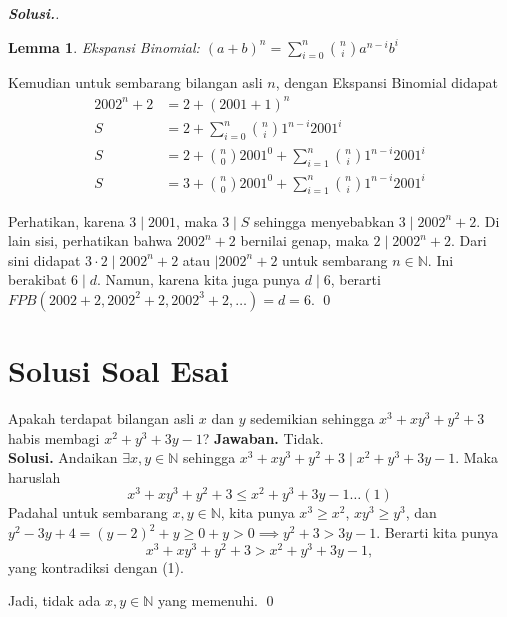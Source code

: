 \documentclass[12pt]{scrartcl}
\newtheorem{lemma}{Lemma} %
\begin{document}
\begin{enumerate}
\begin{proof}[\textbf{Solusi.}]
		\begin{lemma}
					Ekspansi Binomial: $(a+b)^n=\sum_{i=0}^{n} {n \choose i}a^{n-i}b^i$
		\end{lemma}
		
		Kemudian untuk sembarang bilangan asli $n$, dengan Ekspansi Binomial didapat
		\begin{align*}
		2002^n+2 &= 2+(2001+1)^n\\
			S	&= 2 + \sum_{i=0}^{n} {n \choose i}1^{n-i}2001^i\\
			S	&= 2 + {n \choose 0}2001^0 + \sum_{i=1}^{n} {n \choose i}1^{n-i}2001^i\\
			S	&= 3 + {n \choose 0}2001^0 + \sum_{i=1}^{n} {n \choose i}1^{n-i}2001^i
		\end{align*}
			
		Perhatikan, karena $3 \mid 2001$, maka $3 \mid S$ sehingga menyebabkan $3 \mid 2002^n+2$. Di lain sisi, perhatikan bahwa $2002^n+2$ bernilai genap, maka $2 \mid 2002^n +2$. Dari sini didapat $3\cdot2 \mid 2002^n+2$ atau $\mid 2002^n+2$ untuk sembarang $n \in \mathbb{N}$. Ini berakibat $6 \mid d$. Namun, karena kita juga punya $d \mid 6$, berarti $FPB(2002+2,2002^2+2,2002^3+2,\dots)=d=6$. \qed
  \end{proof}

\end{enumerate}

\section{Solusi Soal Esai}
Apakah terdapat bilangan asli $x$ dan $y$ sedemikian sehingga $x^3+xy^3+y^2+3$ habis membagi $x^2+y^3+3y-1$?
	\textbf{Jawaban. }
	Tidak.\\
 
	\textbf{Solusi. }
	Andaikan $\exists x,y \in \mathbb{N}$ sehingga $x^3+xy^3+y^2+3 \mid x^2+y^3+3y-1$. Maka haruslah 
	 $$x^3+xy^3+y^2+3 \le x^2+y^3+3y-1 \dots (1)$$
	Padahal untuk sembarang $x,y \in \mathbb{N}$, kita punya $x^3 \ge x^2$,   $xy^3 \ge y^3$, dan\\ $y^2-3y+4 = (y-2)^2+y \ge 0 + y > 0 \implies y^2+3 > 3y -1$. Berarti kita punya $$x^3+xy^3+y^2+3 > x^2+y^3+3y-1,$$ yang kontradiksi dengan (1).
	
	Jadi, tidak ada $x,y \in \mathbb{N}$ yang memenuhi. \qed
\end{document}
